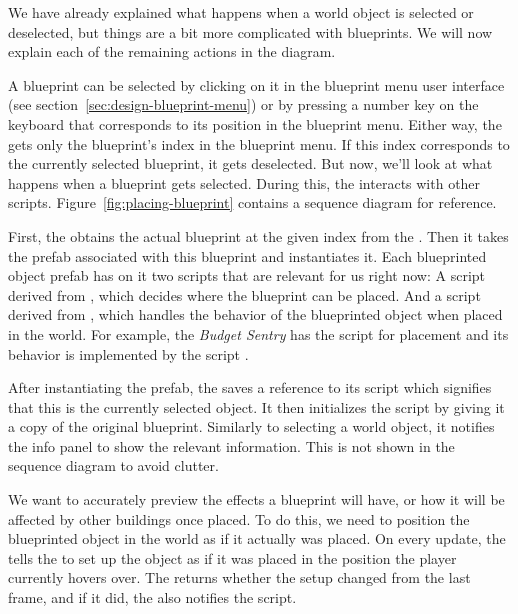 We have already explained what happens when a world object is selected or deselected, but things are a bit more complicated with blueprints.
We will now explain each of the remaining actions in the diagram.

A blueprint can be selected by clicking on it in the blueprint menu user interface (see section~\ref{sec:design-blueprint-menu}) or by pressing a number key on the keyboard that corresponds to its position in the blueprint menu.
Either way, the  gets only the blueprint's index in the blueprint menu.
If this index corresponds to the currently selected blueprint, it gets deselected.
But now, we'll look at what happens when a blueprint gets selected.
During this, the  interacts with other scripts.
Figure~\ref{fig:placing-blueprint} contains a sequence diagram for reference.

First, the  obtains the actual blueprint at the given index from the .
Then it takes the prefab associated with this blueprint and instantiates it.
Each blueprinted object prefab has on it two scripts that are relevant for us right now:
A script derived from , which decides where the blueprint can be placed.
And a script derived from , which handles the behavior of the blueprinted object when placed in the world.
For example, the \emph{Budget Sentry} has the script  for placement and its behavior is implemented by the script .

After instantiating the prefab, the  saves a reference to its  script which signifies that this is the currently selected object.
It then initializes the  script by giving it a copy of the original blueprint.
Similarly to selecting a world object, it notifies the info panel to show the relevant information.
This is not shown in the sequence diagram to avoid clutter.

We want to accurately preview the effects a blueprint will have, or how it will be affected by other buildings once placed.
To do this, we need to position the blueprinted object in the world as if it actually was placed.
On every update, the  tells the  to set up the object as if it was placed in the position the player currently hovers over.
The  returns whether the setup changed from the last frame, and if it did, the  also notifies the  script.

